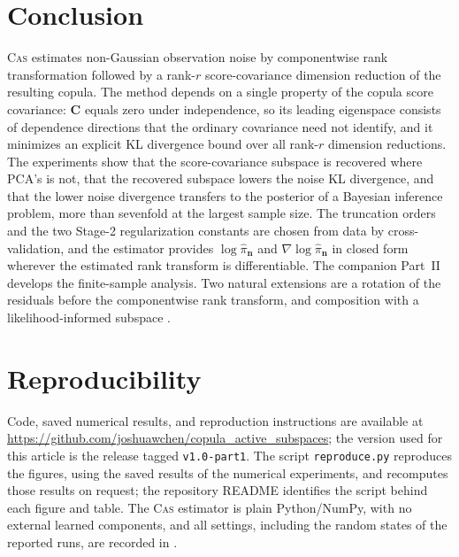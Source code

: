 \documentclass[review,hidelinks,onefignum,onetabnum]{siamart251216}
\newcommand{\mC}{\bm{C}}
\newcommand{\vn}{\bm{n}}
\begin{document}
\section{Conclusion}
\label{sec:conclusion}

\textsc{Cas} estimates non-Gaussian observation noise by componentwise rank transformation followed by a rank-$r$ score-covariance dimension reduction of the resulting copula. The method depends on a single property of the copula score covariance: $\mC$ equals zero under independence, so its leading eigenspace consists of dependence directions that the ordinary covariance need not identify, and it minimizes an explicit KL divergence bound over all rank-$r$ dimension reductions. The experiments show that the score-covariance subspace is recovered where PCA's is not, that the recovered subspace lowers the noise KL divergence, and that the lower noise divergence transfers to the posterior of a Bayesian inference problem, more than sevenfold at the largest sample size. The truncation orders and the two Stage-2 regularization constants are chosen from data by cross-validation, and the estimator provides $\log\widehat\pi_{\vn}$ and $\nabla\log\widehat\pi_{\vn}$ in closed form wherever the estimated rank transform is differentiable. The companion Part~II \cite{CAS_partII} develops the finite-sample analysis. Two natural extensions are a rotation of the residuals before the componentwise rank transform, and composition with a likelihood-informed subspace \cite{CuiMartinMarzoukSolonenSpantini2014, ZahmCuiLawSpantiniMarzouk2022}.

\section*{Reproducibility}
\label{sec:reproducibility}

Code, saved numerical results, and reproduction instructions are available at \url{https://github.com/joshuawchen/copula_active_subspaces}; the version used for this article is the release tagged \texttt{v1.0-part1}. The script \texttt{reproduce.py} reproduces the figures, using the saved results of the numerical experiments, and recomputes those results on request; the repository README identifies the script behind each figure and table. The \textsc{Cas} estimator is plain Python/NumPy, with no external learned components, and all settings, including the random states of the reported runs, are recorded in .


\appendix
{}
\end{document}
